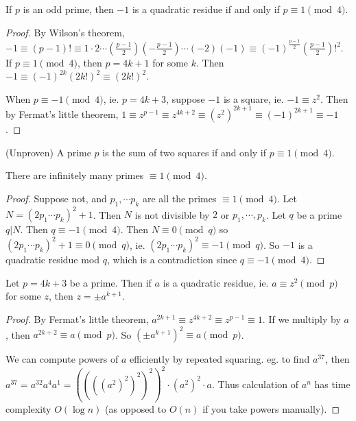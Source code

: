 \documentclass[a4paper]{article}
\begin{document}
  \begin{prop}
    If $p$ is an odd prime, then $-1$ is a quadratic residue if and only if $p\equiv 1\pmod 4$.
  \end{prop}

  \begin{proof}
    By Wilson's theorem, $-1 \equiv (p - 1)!\equiv 1\cdot 2\cdots \left(\frac{p - 1}{2}\right)\left(-\frac{p - 1}{2}\right)\cdots (-2)(-1)\equiv (-1)^{\frac{p - 1}{2}}\left(\frac{p - 1}{2}\right)!^2$. If $p\equiv 1\pmod 4$, then $p = 4k + 1$ for some $k$. Then $-1\equiv (-1)^{2k}(2k!)^2 \equiv (2k!)^2$.

    When $p \equiv -1\pmod 4$, ie. $p = 4k + 3$, suppose $-1$ is a square, ie. $-1 \equiv z^2$. Then by Fermat's little theorem, $1\equiv z^{p - 1} \equiv z^{4k+ 2}\equiv (z^2)^{2k + 1} \equiv (-1)^{2k + 1}\equiv -1$.
  \end{proof}
  \begin{prop}
    (Unproven) A prime $p$ is the sum of two squares if and only if $p\equiv 1\pmod 4$.
  \end{prop}

  \begin{prop}
    There are infinitely many primes $\equiv 1\pmod 4$.
  \end{prop}

  \begin{proof}
    Suppose not, and $p_1, \cdots p_k$ are all the primes $\equiv 1\pmod 4$. Let $N = (2p_1\cdots p_k)^2 + 1$. Then $N$ is not divisible by $2$ or $p_1,\cdots, p_k$. Let $q$ be a prime $q | N$. Then $q \equiv -1\pmod 4$. Then $N \equiv 0\pmod q$ so $(2p_1\cdots p_k)^2 + 1\equiv 0\pmod q$, ie. $(2p_1\cdots p_k)^2 \equiv -1\pmod q$. So $-1$ is a quadratic residue mod $q$, which is a contradiction since $q \equiv -1\pmod 4$.
  \end{proof}

  \begin{prop}
    Let $p = 4k + 3$ be a prime. Then if $a$ is a quadratic residue, ie. $a \equiv z^2 \pmod p$ for some $z$, then $z = \pm a^{k + 1}$.
  \end{prop}

  \begin{proof}
    By Fermat's little theorem, $a^{2k + 1} \equiv z^{4k + 2} \equiv z^{p - 1} \equiv 1$. If we multiply by $a$, then $a^{2k + 2} \equiv a \pmod p$. So $(\pm a^{k + 1})^2 \equiv a \pmod p$.

    \note We can compute powers of $a$ efficiently by repeated squaring. eg. to find $a^37$, then $a^{37} = a^{32}a^4a^1 = ((((a^2)^2)^2)^2)^2 \cdot (a^2)^2\cdot a$. Thus calculation of $a^n$ has time complexity $O(\log n)$ (as opposed to $O(n)$ if you take powers manually).
  \end{proof}
\end{document}

